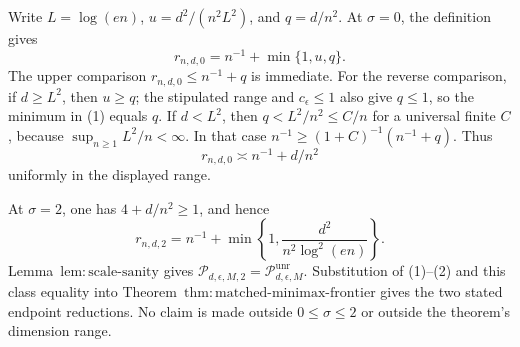Write \(L=\log(en)\), \(u=d^2/(n^2L^2)\), and \(q=d/n^2\).  At \(\sigma=0\), the definition gives
\[
 r_{n,d,0}=n^{-1}+\min\{1,u,q\}.
\tag{1}
\]
The upper comparison \(r_{n,d,0}\le n^{-1}+q\) is immediate.  For the reverse comparison, if \(d\ge L^2\), then \(u\ge q\); the stipulated range and \(c_{\epsilon}\le1\) also give \(q\le1\), so the minimum in (1) equals \(q\).  If \(d<L^2\), then \(q<L^2/n^2\le C/n\) for a universal finite \(C\), because \(\sup_{n\ge1}L^2/n<\infty\).  In that case \(n^{-1}\ge (1+C)^{-1}(n^{-1}+q)\).  Thus
\[
 r_{n,d,0}\asymp n^{-1}+d/n^2
\]
uniformly in the displayed range.

At \(\sigma=2\), one has \(4+d/n^2\ge1\), and hence
\[
 r_{n,d,2}=n^{-1}+\min\left\{1,\frac{d^2}{n^2\log^2(en)}\right\}.
\tag{2}
\]
Lemma~\(\mathrm{lem:scale\text{-}sanity}\) gives \(\mathcal P_{d,\epsilon,M,2}=\mathcal P_{d,\epsilon,M}^{\mathrm{unr}}\).  Substitution of (1)--(2) and this class equality into Theorem~\(\mathrm{thm:matched\text{-}minimax\text{-}frontier}\) gives the two stated endpoint reductions.  No claim is made outside \(0\le\sigma\le2\) or outside the theorem's dimension range.